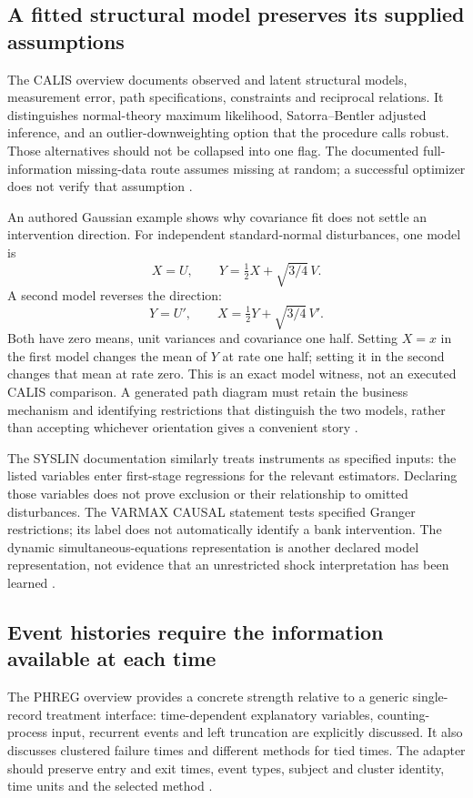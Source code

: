 \subsection{A fitted structural model preserves its supplied assumptions}
The CALIS overview documents observed and latent structural models,
measurement error, path specifications, constraints and reciprocal relations.
It distinguishes normal-theory maximum likelihood, Satorra--Bentler adjusted
inference, and an outlier-downweighting option that the procedure calls
robust. Those alternatives should not be collapsed into one flag. The
documented full-information missing-data route assumes missing at random;
a successful optimizer does not verify that assumption
\citep{exec13_latent_sas_calis}.

An authored Gaussian example shows why covariance fit does not settle an
intervention direction. For independent standard-normal disturbances, one
model is
\[
 X=U,\qquad Y=\tfrac12X+\sqrt{3/4}\,V.
\]
A second model reverses the direction:
\[
 Y=U',\qquad X=\tfrac12Y+\sqrt{3/4}\,V'.
\]
Both have zero means, unit variances and covariance one half. Setting $X=x$
in the first model changes the mean of $Y$ at rate one half; setting it in
the second changes that mean at rate zero. This is an exact model witness,
not an executed CALIS comparison. A generated path diagram must retain the
business mechanism and identifying restrictions that distinguish the two
models, rather than accepting whichever orientation gives a convenient
story \citep{exec24_sas_choice}.

The SYSLIN documentation similarly treats instruments as specified inputs:
the listed variables enter first-stage regressions for the relevant
estimators. Declaring those variables does not prove exclusion or their
relationship to omitted disturbances. The VARMAX CAUSAL statement tests
specified Granger restrictions; its label does not automatically identify
a bank intervention. The dynamic simultaneous-equations representation is
another declared model representation, not evidence that an unrestricted
shock interpretation has been learned
\citep{exec13_ivrd_sas,exec13_ct_sas_causal,exec13_ct_sas_structural}.

\subsection{Event histories require the information available at each time}
The PHREG overview provides a concrete strength relative to a generic
single-record treatment interface: time-dependent explanatory variables,
counting-process input, recurrent events and left truncation are explicitly
discussed. It also discusses clustered failure times and different methods
for tied times. The adapter should preserve entry and exit times, event
types, subject and cluster identity, time units and the selected method
\citep{exec14_survival_sas}.

